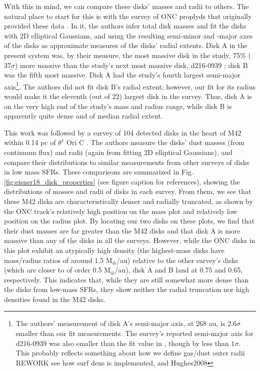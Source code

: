 With this in mind, we can compare these disks' masses and radii to others. The natural place to start for this is with the survey of ONC proplyds that originally provided these data \citep{Mann2014}. In it, the authors infer total disk masses and fit the disks with 2D elliptical Gaussians, and using the resulting semi-minor and -major axes of the disks as approximate measures of the disks' radial extents. Disk A in the present system was, by their measure, the most massive disk in the study, 75\% ($37\sigma$) more massive than the study's next most massive disk, d216-0939 \citep[which was the subject of][]{Factor2017} ; disk B was the fifth most massive. Disk A had the study's fourth largest semi-major axis\footnote{The authors' measurement of disk A's semi-major axis, at 268 au, is $2.6\sigma$ smaller than our fit measurements. The survey's reported semi-major axis for d216-0939 was also smaller than the fit value in \citet{Factor2017}, though by less than $1\sigma$. This probably reflects something about how we define gas/dust outer radii REWORK see how surf dens is implemented, and Hughes2008}. The authors did not fit disk B's radial extent; however, our fit for its radius would make it the eleventh (out of 22) largest disk in the survey. Thus, disk A is on the very high end of the study's mass and radius range, while disk B is apparently quite dense and of median radial extent.



This work was followed by a survey of 104 detected disks in the heart of M42 within 0.14 pc of $\theta^1$ Ori C \citep{Eisner2018}. The authors measure the disks' dust masses (from continuum flux) and radii (again from fitting 2D elliptical Gaussians), and compare their distributions to similar measurements from other surveys of disks in low mass SFRs. These comparisons are summarized in Fig. \ref{fig:eisner18_disk_properties} (see figure caption for references), showing the distributions of masses and radii of disks in each survey. From them, we see that these M42 disks are characteristically denser and radially truncated, as shown by the ONC track's relatively high position on the mass plot and relatively low position on the radius plot. By locating our two disks on these plots, we find that their dust masses are far greater than the M42 disks and that disk A is more massive than any of the disks in all the surveys. However, while the ONC disks in this plot exhibit an atypically high density (the highest-mass disks have mass/radius ratios of around 1.5 M$_\oplus$/au) relative to the other survey's disks (which are closer to of order 0.5 M$_\oplus$/au), disk A and B land at 0.75 and 0.65, respectively. This indicates that, while they are still somewhat more dense than the disks from low-mass SFRs, they show neither the radial truncation nor high densities found in the M42 disks.

